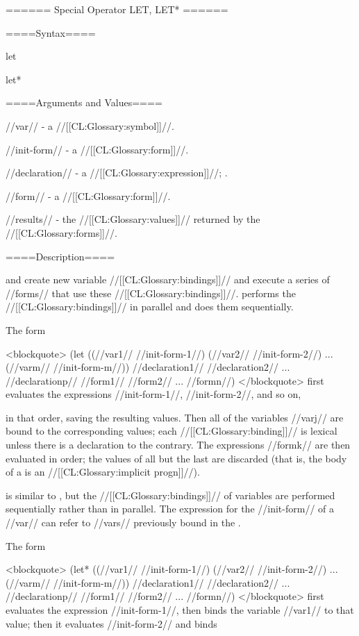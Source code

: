 ====== Special Operator LET, LET* ======

====Syntax====

\DefspecWithValues let {\paren{\star{\VarValue}}  } {}

\DefspecWithValues let* {\paren{\star{\VarValue}}  } {}

====Arguments and Values====

//var// - a //[[CL:Glossary:symbol]]//.

//init-form// - a //[[CL:Glossary:form]]//.

//declaration// - a  //[[CL:Glossary:expression]]//; \noeval.

//form// - a //[[CL:Glossary:form]]//.

//results// - the //[[CL:Glossary:values]]// returned by the //[[CL:Glossary:forms]]//.

====Description====

 and  create new variable //[[CL:Glossary:bindings]]// and execute a series of //forms// that use these //[[CL:Glossary:bindings]]//.  performs the //[[CL:Glossary:bindings]]// in parallel and  does them sequentially.


The form

<blockquote> (let ((//var1// //init-form-1//) (//var2// //init-form-2//) ... (//varm// //init-form-m//)) //declaration1// //declaration2// ... //declarationp// //form1// //form2// ... //formn//) </blockquote> first evaluates the expressions //init-form-1//, //init-form-2//, and so on,

in that order, saving the resulting values. Then all of the variables //varj// are bound to the corresponding values; each //[[CL:Glossary:binding]]// is lexical unless there is a  declaration to the contrary. The expressions //formk// are then evaluated in order; the values of all but the last are discarded (that is, the body of a  is an //[[CL:Glossary:implicit progn]]//).

 is similar to , but the //[[CL:Glossary:bindings]]// of variables are performed sequentially rather than in parallel. The expression for the //init-form// of a //var// can refer to //vars// previously bound in the .


The form

<blockquote> (let* ((//var1// //init-form-1//) (//var2// //init-form-2//) ... (//varm// //init-form-m//)) //declaration1// //declaration2// ... //declarationp// //form1// //form2// ... //formn//) </blockquote> first evaluates the expression //init-form-1//, then binds the variable //var1// to that value; then it evaluates //init-form-2// and binds

